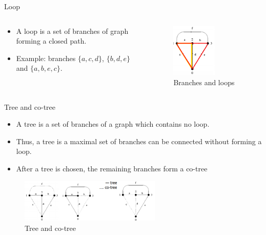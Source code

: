 \documentclass[xcolor=dvipsnames]{beamer}
\begin{document}
\begin{frame}{Loop}
    \begin{columns}
        \begin{column}{.45\textwidth}
 		\begin{itemize}
			\item A loop is a set of branches of graph forming a closed path.
			\item Example: branches $\{a,c,d\}$, $\{b,d,e\}$ and $\{a,b,e,c\}$.		
		\end{itemize}
        \end{column}
		\begin{column}{.55\textwidth}
 		\begin{figure}[!ht]
  			\centering
    		\includegraphics[width=0.6\textwidth]{loop.png}
   			 \caption[figure 3]{Branches and loops}
    		\label{fig:eg3}
    	\end{figure}
      	\end{column}
    \end{columns}
\end{frame}

\begin{frame}{Tree and co-tree}
\begin{itemize}
		\item A {\color{purple}tree} is a set of branches of a graph which contains no loop. 
		\item Thus, a tree is a maximal set of branches can be connected without forming a loop.
		\item After a tree is chosen, the remaining branches form a {\color{purple}co-tree}
\end{itemize}	
 		\begin{figure}[!ht]
  			\centering
    		\includegraphics[width=0.6\textwidth]{tree1.png}
   			 \caption[figure 3]{Tree and co-tree}
    	\end{figure}
\end{frame}
\end{document}
